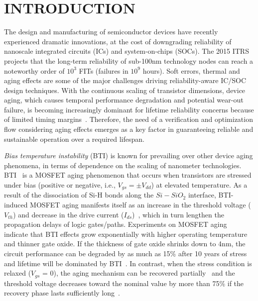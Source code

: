 \chapter{INTRODUCTION}
The design and manufacturing of semiconductor devices have recently experienced dramatic innovations, at the cost of downgrading reliability of nanoscale integrated circuits (ICs) and system-on-chips (SOCs). The 2015 ITRS~\cite{itrs2015} projects that the long-term reliability of sub-100nm technology nodes can reach a noteworthy order of $10^3$ FITs (failures in $10^9$ hours). Soft errors, thermal and aging effects are some of the major challenges driving reliability-aware IC/SOC design techniques. With the continuous scaling of transistor dimensions, device aging, which causes temporal performance degradation and potential wear-out failure, is becoming increasingly dominant for lifetime reliability concerns because of limited timing margins~\cite{mcpherson2006reliability}. Therefore, the need of a verification and optimization flow considering aging effects emerges as a key factor in guaranteeing reliable and sustainable operation over a required lifespan.

\textit{Bias temperature instability} (BTI) is known for prevailing over other device aging phenomena, in terms of dependence on the scaling of nanometer technologies. BTI~\cite{schroder2003negative} is a MOSFET aging phenomenon that occurs when transistors are stressed under bias (positive or negative, i.e., $V_{gs} = \pm V_{dd}$) at elevated temperature. As a result of the dissociation of Si-H bonds along the $Si-SiO_{2}$ interface, BTI-induced MOSFET aging manifests itself as an increase in the threshold voltage ($V_{th}$) and decrease in the drive current ($I_{ds}$)~\cite{stathis2006negative}, which in turn lengthen the propagation delays of logic gates/paths. Experiments on MOSFET aging~\cite{chakravarthi2004comprehensive} indicate that BTI effects grow exponentially with higher operating temperature and thinner gate oxide. If the thickness of gate oxide shrinks down to 4nm, the circuit performance can be degraded by as much as 15\% after 10 years of stress and lifetime will be dominated by BTI~\cite{kimizuka1999impact}. In contrast, when the stress condition is relaxed ($V_{gs}$ = 0), the aging mechanism can be recovered partially~\cite{kumar2006analytical} and the threshold voltage decreases toward the nominal value by more than 75\% if the recovery phase lasts sufficiently long~\cite{wang2010impact}.

